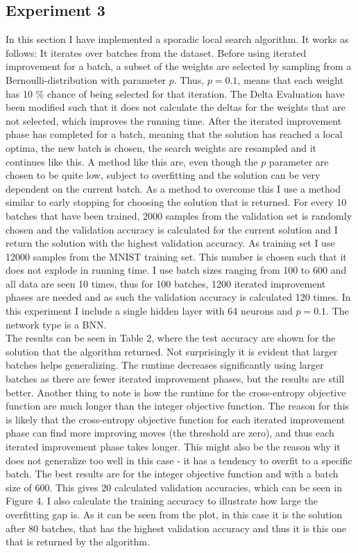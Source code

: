 \subsection{Experiment 3}
In this section I have implemented a sporadic local search algorithm. It works as follows: It iterates over batches from the dataset. Before using iterated improvement for a batch, a subset of the weights are selected by sampling from a Bernoulli-distribution with parameter $p$. Thus, $p = 0.1$, means that each weight has 10 \% chance of being selected for that iteration. The Delta Evaluation have been modified such that it does not calculate the deltas for the weights that are not selected, which improves the running time. After the iterated improvement phase has completed for a batch, meaning that the solution has reached a local optima, the new batch is chosen, the search weights are resampled and it continues like this. A method like this are, even though the $p$ parameter are chosen to be quite low, subject to overfitting and the solution can be very dependent on the current batch. As a method to overcome this I use a method similar to early stopping for choosing the solution that is returned. For every 10 batches that have been trained, 2000 samples from the validation set is randomly chosen and the validation accuracy is calculated for the current solution and I return the solution with the highest validation accuracy. As training set I use 12000 samples from the MNIST training set. This number is chosen such that it does not explode in running time. I use batch sizes ranging from 100 to 600 and all data are seen 10 times, thus for 100 batches, 1200 iterated improvement phases are needed and as such the validation accuracy is calculated 120 times. In this experiment I include a single hidden layer with 64 neurons and $p = 0.1$. The network type is a BNN.\\

The results can be seen in Table 2, where the test accuracy are shown for the solution that the algorithm returned. Not surprisingly it is evident that larger batches helps generalizing. The runtime decreases significantly using larger batches as there are fewer iterated improvement phases, but the results are still better. Another thing to note is how the runtime for the cross-entropy objective function are much longer than the integer objective function. The reason for this is likely that the cross-entropy objective function for each iterated improvement phase can find more improving moves (the threshold are zero), and thus each iterated improvement phase takes longer. This might also be the reason why it does not generalize too well in this case - it has a tendency to overfit to a specific batch. The best results are for the integer objective function and with a batch size of 600. This gives 20 calculated validation accuracies, which can be seen in Figure 4. I also calculate the training accuracy to illustrate how large the overfitting gap is. As it can be seen from the plot, in this case it is the solution after 80 batches, that has the highest validation accuracy and thus it is this one that is returned by the algorithm.  


